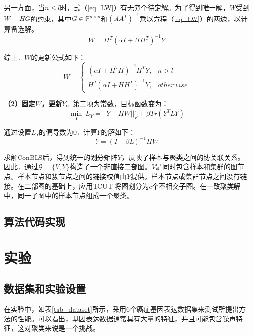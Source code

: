 \documentclass[unicode,pdfcover]{hquthesis}
\begin{document}
另一方面，当$n\leq l$时，式（\ref{eq_LW}）有无穷个待定解。为了得到唯一解，$W$受到$W=HG$的约束，其中$G\in \mathbb{R}^{n\times n}$和$(AA^T)^{-1}$乘以方程（\ref{eq_LW}）的两边，以计算备选解。
\begin{equation}
	W=H^T(\alpha I+HH^T)^{-1}Y
\end{equation}

综上，$W$的更新公式如下：
\begin{equation}\label{eq_W}
	W=\begin{cases}
		(\alpha I+H^TH)^{-1}H^TY, & n>l \\
		H^T(\alpha I+HH^T)^{-1}Y, & otherwise
	\end{cases}
\end{equation}


\textbf{（2）固定$W$，更新$Y$}。第二项为常数，目标函数变为：
\begin{equation}
	\min_{Y}~L_Y=||Y-HW||^2_F+\beta Tr(Y^TLY)
\end{equation}

通过设置$L_Y$的偏导数为0，计算$Y$的解如下：
\begin{equation}\label{eq_Y}
	Y=(I+\beta L)^{-1}HW
\end{equation}

求解ConBLS后，得到统一的划分矩阵$Y$，反映了样本与聚类之间的协关联关系。因此，通过$\mathcal{G}=\{V,Y\}$构造了一个非直接二部图。$V$是同时包含样本和集群的图节点。样本节点和簇节点之间的链接权值由$Y$提供。样本节点或集群节点之间没有链接。在二部图的基础上，应用TCUT \cite{Li2012Segmentation}\cite{Huang2017Locally}将图划分为$c$个不相交子图。在一致聚类解中，同一子图中的样本节点组成一个聚类。

\section{算法代码实现}

\chapter{实验}\label{chapter_exp}

\section{数据集和实验设置}
在实验中，如表\ref{tab_dataset}所示，采用6个癌症基因表达数据集\cite{UCI2013dataset}来测试所提出方法的性能。可以看出，基因表达数据通常具有大量的特征，并且可能包含噪声特征，这对聚类来说是一个挑战。
\end{document}
